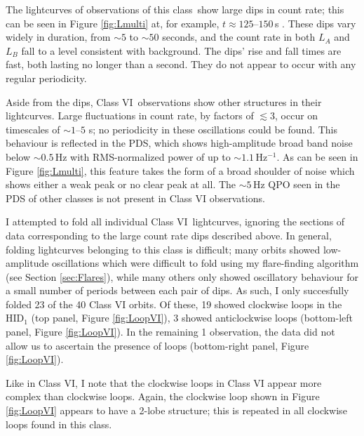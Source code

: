 \par The lightcurves of observations of this class\indexvi\ show large dips in count rate; this can be seen in Figure \ref{fig:Lmulti} at, for example, $t\approx125$--$150$\,s .  These dips vary widely in duration, from $\sim5$ to $\sim50$ seconds, and the count rate in both $L_A$ and $L_B$ fall to a level consistent with background.  The dips' rise and fall times are fast, both lasting no longer than a second.  They do not appear to occur with any regular periodicity.
\par Aside from the dips, Class VI\indexvi\ observations show other structures in their lightcurves.  Large fluctuations in count rate, by factors of $\lesssim3$, occur on timescales of $\sim1\mbox{--}5$ s; no periodicity in these oscillations could be found.  This behaviour is reflected in the PDS, which shows high-amplitude broad band noise below $\sim0.5$\,Hz with RMS-normalized power \citep{Belloni_RMSNorm} of up to $\sim1.1 $\,Hz$^{-1}$.  As can be seen in Figure \ref{fig:Lmulti}, this feature takes the form of a broad shoulder of noise which shows either a weak peak or no clear peak at all.  The $\sim5$\,Hz QPO seen in the PDS of other classes is not present in Class VI observations.
\par I attempted to fold all individual Class VI\indexvi\ lightcurves, ignoring the sections of data corresponding to the large count rate dips described above.  In general, folding lightcurves belonging to this class is difficult; many orbits showed low-amplitude oscillations which were difficult to fold using my flare-finding algorithm (see Section \ref{sec:Flares}), while many others only showed oscillatory behaviour for a small number of periods between each pair of dips.  As such, I only succesfully folded 23 of the 40 Class VI orbits.  Of these, 19 showed clockwise loops in the HID$_1$ (top panel, Figure \ref{fig:LoopVI}), 3 showed anticlockwise loops (bottom-left panel, Figure \ref{fig:LoopVI}).  In the remaining 1 observation, the data did not allow us to ascertain the presence of loops (bottom-right panel, Figure \ref{fig:LoopVI}).
\par Like in Class VI, I note that the clockwise loops in Class VI appear more complex than clockwise loops.  Again, the clockwise loop shown in Figure \ref{fig:LoopVI} appears to have a 2-lobe structure; this is repeated in all clockwise loops found in this class.

